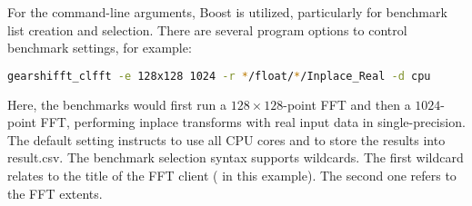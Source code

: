 For the command-line arguments, Boost is utilized, particularly for benchmark list creation and selection.
There are several \gearshifft{} program options to control benchmark settings, for example:
\begin{lstlisting}[language=bash]
gearshifft_clfft -e 128x128 1024 -r */float/*/Inplace_Real -d cpu
\end{lstlisting}
Here, the \clfft{} benchmarks would first run a $128{\times}128$-point FFT and then a $1024$-point FFT, performing inplace transforms with real input data in single-precision. The default setting instructs \gearshifft{} to use all CPU cores and to store the results into result.csv. The \gearshifft{} benchmark selection syntax supports wildcards. The first wildcard \mc{*} relates to the title of the FFT client ( in this example). The second one refers to the FFT extents.
